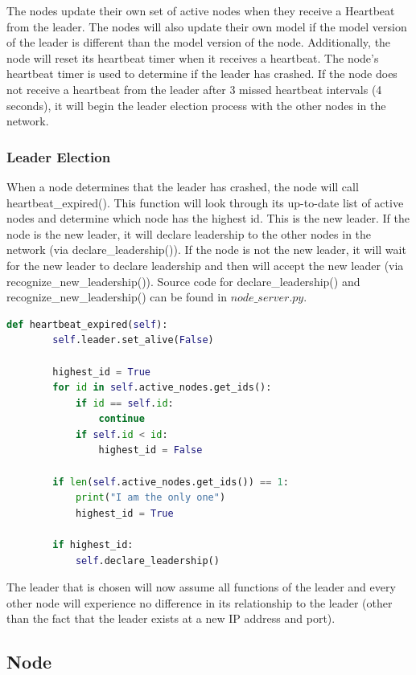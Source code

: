 \documentclass{article}
\begin{document}
The nodes update their own set of active nodes when they receive a Heartbeat from the leader. The nodes will also update their own model if the model version of the leader is different than the model version of the node. Additionally, the node will reset its heartbeat timer when it receives a heartbeat. The node's heartbeat timer is used to determine if the leader has crashed. If the node does not receive a heartbeat from the leader after 3 missed heartbeat intervals (4 seconds), it will begin the leader election process with the other nodes in the network.



\subsubsection{Leader Election}
\label{sec:le}
When a node determines that the leader has crashed, the node will call heartbeat\_expired(). This function will look through its up-to-date list of active nodes and determine which node has the highest id. This is the new leader. If the node is the new leader, it will declare leadership to the other nodes in the network (via declare\_leadership()). If the node is not the new leader, it will wait for the new leader to declare leadership and then will accept the new leader (via recognize\_new\_leadership()). Source code for declare\_leadership() and recognize\_new\_leadership() can be found in $node\_server.py$.

\begin{lstlisting}[language=Python]
    def heartbeat_expired(self):
        self.leader.set_alive(False)
    
        highest_id = True
        for id in self.active_nodes.get_ids():
            if id == self.id:
                continue
            if self.id < id:
                highest_id = False

        if len(self.active_nodes.get_ids()) == 1:
            print("I am the only one")
            highest_id = True

        if highest_id:
            self.declare_leadership()

\end{lstlisting}

The leader that is chosen will now assume all functions of the leader and every other node will experience no difference in its relationship to the leader (other than the fact that the leader exists at a new IP address and port). 


\subsection{Node}
\label{sec:node}
\end{document}
